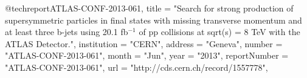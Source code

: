 @techreport{ATLAS-CONF-2013-061,
      title         = "{Search for strong production of supersymmetric particles
                       in final states with missing transverse momentum and at
                       least three b-jets using 20.1 fb$^{-1}$ of pp collisions at
                       sqrt(s) = 8 TeV with the ATLAS Detector.}",
      institution   = "CERN",
      address       = "Geneva",
      number        = "ATLAS-CONF-2013-061",
      month         = "Jun",
      year          = "2013",
      reportNumber  = "ATLAS-CONF-2013-061",
      url           = "http://cds.cern.ch/record/1557778",
}

